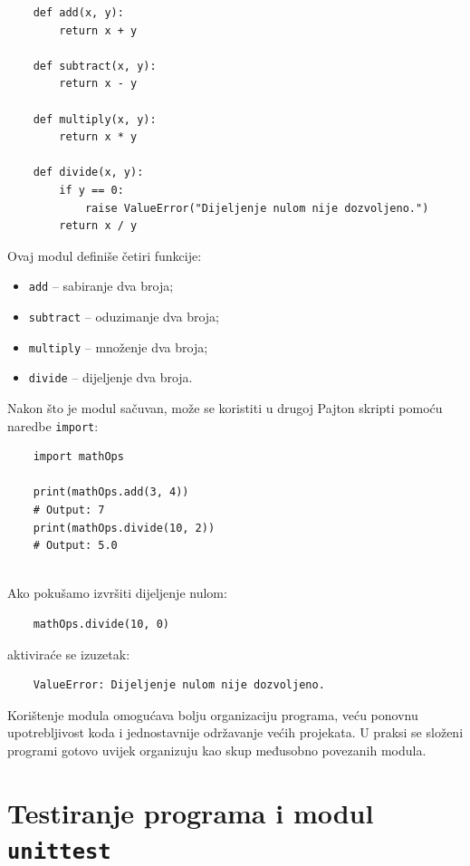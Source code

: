 \begin{verbatim}
	def add(x, y):
	    return x + y
	
	def subtract(x, y):
	    return x - y
	
	def multiply(x, y):
	    return x * y
	
	def divide(x, y):
	    if y == 0:
	        raise ValueError("Dijeljenje nulom nije dozvoljeno.")
	    return x / y
\end{verbatim}

Ovaj modul definiše četiri funkcije:

\begin{itemize}
	\item \texttt{add} -- sabiranje dva broja;
	\item \texttt{subtract} -- oduzimanje dva broja;
	\item \texttt{multiply} -- množenje dva broja;
	\item \texttt{divide} -- dijeljenje dva broja.
\end{itemize}

Nakon što je modul sačuvan, može se koristiti u drugoj Pajton skripti pomoću naredbe \texttt{import}:

\begin{verbatim}
	import mathOps
	
	print(mathOps.add(3, 4))
	# Output: 7
	print(mathOps.divide(10, 2))
	# Output: 5.0
	
\end{verbatim}

Ako pokušamo izvršiti dijeljenje nulom:

\begin{verbatim}
	mathOps.divide(10, 0)
\end{verbatim}

aktiviraće se izuzetak:

\begin{verbatim}
	ValueError: Dijeljenje nulom nije dozvoljeno.
\end{verbatim}

Korištenje modula omogućava bolju organizaciju programa, veću ponovnu upotrebljivost koda i jednostavnije održavanje većih projekata. U praksi se složeni programi gotovo uvijek organizuju kao skup međusobno povezanih modula.




\section{Testiranje programa i modul \texttt{unittest}}

